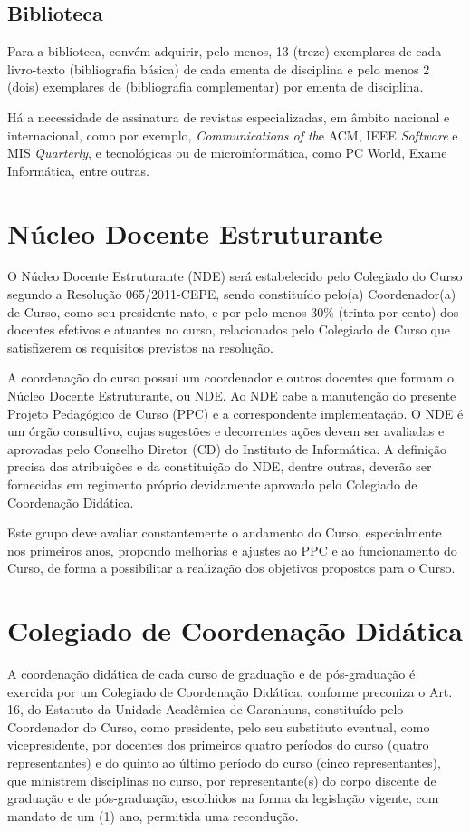 \documentclass[
	12pt,				%
	openright,			%
  oneside,     %
	a4paper,			%
	english,			%
	french,				%
	spanish,			%
	brazil				%
	]{abntex2}
\begin{document}
\subsection{Biblioteca}
 
Para a biblioteca, convém adquirir, pelo menos, 13 (treze) exemplares de
cada livro-texto (bibliografia básica) de cada  ementa de disciplina e pelo menos 2 (dois) exemplares de
(bibliografia complementar) por ementa de disciplina.

Há a necessidade de assinatura de revistas especializadas, em âmbito nacional e internacional, como por exemplo, 
\textit{Communications of th}e ACM, IEEE \textit{Software} e MIS \textit{Quarterly}, e
tecnológicas ou de microinformática, como PC World, Exame Informática, entre outras.

\section{Núcleo Docente Estruturante}


O Núcleo Docente Estruturante (NDE) será estabelecido pelo Colegiado do Curso
segundo a Resolução 065/2011-CEPE, sendo constituído pelo(a) Coordenador(a)
de Curso, como seu presidente nato, e por pelo menos 30\% (trinta por cento) dos
docentes efetivos e atuantes no curso, relacionados pelo Colegiado de Curso que
satisfizerem os requisitos previstos na resolução.

A coordenação do curso possui um coordenador e outros docentes que formam o Núcleo Docente Estruturante, ou NDE. 
Ao NDE cabe a manutenção do presente Projeto Pedagógico de Curso (PPC) e a correspondente implementação. O NDE é 
um órgão consultivo, cujas sugestões e decorrentes ações devem ser avaliadas e aprovadas pelo Conselho Diretor (CD) do 
Instituto de Informática. A definição precisa das atribuições e da constituição do NDE, dentre outras, deverão ser fornecidas em regimento próprio devidamente aprovado pelo Colegiado de Coordenação Didática.


Este grupo deve avaliar constantemente o andamento do Curso, especialmente nos 
primeiros anos, propondo melhorias e ajustes ao PPC e ao funcionamento do Curso,
de forma a possibilitar a realização dos objetivos propostos para o Curso.


\section{Colegiado de Coordenação Didática}

A coordenação didática de cada curso de graduação e de
pós-graduação é exercida por um Colegiado de Coordenação Didática, conforme preconiza o Art. 16, do Estatuto da Unidade Acadêmica de Garanhuns, constituído
pelo Coordenador do Curso, como presidente, pelo seu substituto eventual,  como
vicepresidente, por docentes dos primeiros quatro períodos do curso (quatro
representantes)  e do quinto ao último período do curso (cinco representantes), 
que ministrem disciplinas no curso, por representante(s) do corpo discente de
graduação e de pós-graduação,  escolhidos na forma da legislação vigente, com
mandato de um (1) ano,  permitida uma recondução.
\end{document}
